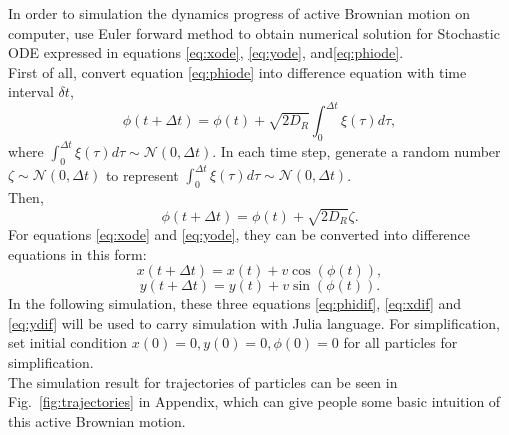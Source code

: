 \documentclass[runningheads]{llncs}
\begin{document}
In order to simulation the dynamics progress of active Brownian motion on computer,
use Euler forward method to obtain numerical solution for Stochastic ODE expressed in equations \eqref{eq:xode}, \eqref{eq:yode}, and\eqref{eq:phiode}.\\
First of all, convert equation \eqref{eq:phiode} into difference equation with time interval $\delta t$,
\begin{equation}
    \phi(t+\Delta t)=\phi(t)+\sqrt{2D_R}\int_0^{\Delta t}\xi(\tau)d\tau,
\end{equation}
where $\int_0^{\Delta t}\xi(\tau)d\tau\sim\mathcal{N}(0,\Delta t)$.
In each time step, generate a random number $\zeta\sim \mathcal{N}(0,\Delta t)$ to represent $\int_0^{\Delta t}\xi(\tau)d\tau\sim\mathcal{N}(0,\Delta t)$.\\
Then,
\begin{equation}
    \label{eq:phidif}
    \phi(t+\Delta t)=\phi(t)+\sqrt{2D_R}\zeta.
\end{equation}
For equations \eqref{eq:xode} and \eqref{eq:yode}, they can be converted into difference equations in this form:
\begin{equation}
    \label{eq:xdif}
    x(t+\Delta t)=x(t)+v\cos(\phi(t)),
\end{equation}
\begin{equation}
    \label{eq:ydif}
    y(t+\Delta t)=y(t)+v\sin(\phi(t)).
\end{equation}
In the following simulation, these three equations \eqref{eq:phidif}, \eqref{eq:xdif} and \eqref{eq:ydif} will be used to carry simulation with Julia language. 
For simplification, set initial condition $x(0)=0,y(0)=0,\phi(0)=0$ for all particles for simplification.\\
The simulation result for trajectories of particles can be seen in Fig.~\ref{fig:trajectories} in Appendix, which can give people some basic intuition of this active Brownian motion.



\end{document}
